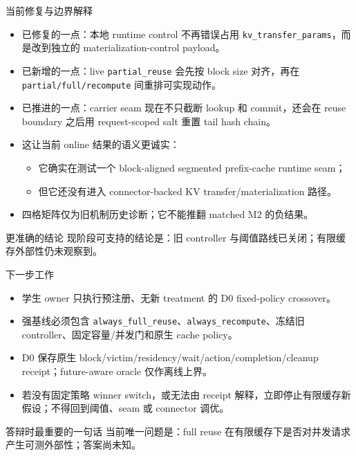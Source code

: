\documentclass[aspectratio=169,UTF8,11pt]{ctexbeamer}
\begin{document}
\begin{frame}{当前修复与边界解释}
  \begin{itemize}
    \item 已修复的一点：本地 runtime control 不再错误占用 \texttt{kv\_transfer\_params}，而是改到独立的 materialization-control payload。
    \item 已新增的一点：live \texttt{partial\_reuse} 会先按 block size 对齐，再在 \texttt{partial/full/recompute} 间重排可实现动作。
    \item 已推进的一点：carrier seam 现在不只截断 lookup 和 commit，还会在 reuse boundary 之后用 request-scoped salt 重置 tail hash chain。
    \item 这让当前 online 结果的语义更诚实：
    \begin{itemize}
      \item 它确实在测试一个 block-aligned segmented prefix-cache runtime seam；
      \item 但它还没有进入 connector-backed KV transfer/materialization 路径。
    \end{itemize}
    \item 四格矩阵仅为旧机制历史诊断；它不能推翻 matched M2 的负结果。
  \end{itemize}

  \vspace{0.5em}
  \begin{block}{更准确的结论}
    现阶段可支持的结论是：\alert{旧 controller 与阈值路线已关闭}；有限缓存外部性仍未观察到。
  \end{block}
\end{frame}

\begin{frame}{下一步工作}
  \begin{itemize}
    \item 学生 owner 只执行预注册、无新 treatment 的 D0 fixed-policy crossover。
    \item 强基线必须包含 \texttt{always\_full\_reuse}、\texttt{always\_recompute}、冻结旧 controller、固定容量/并发门和原生 cache policy。
    \item D0 保存原生 block/victim/residency/wait/action/completion/cleanup receipt；future-aware oracle 仅作离线上界。
    \item 若没有固定策略 winner switch，或无法由 receipt 解释，立即停止有限缓存新假设；不得回到阈值、seam 或 connector 调优。
  \end{itemize}

  \vspace{0.6em}
  \begin{block}{答辩时最重要的一句话}
    当前唯一问题是：\alert{full reuse 在有限缓存下是否对并发请求产生可测外部性}；答案尚未知。
  \end{block}
\end{frame}
\end{document}
